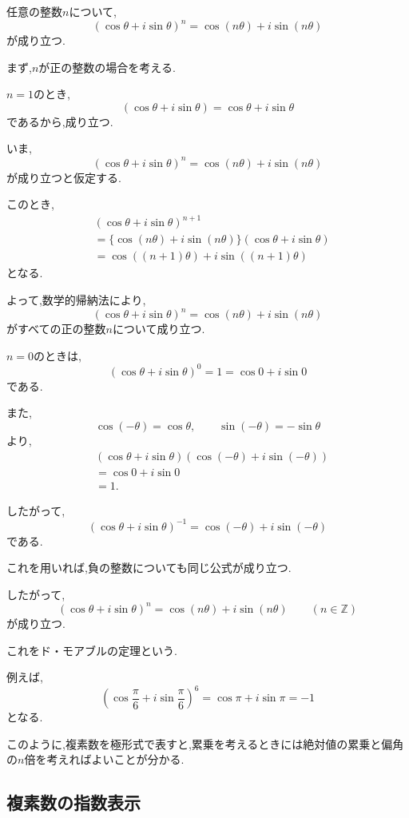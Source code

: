   任意の整数$n$について,
  \[
    (\cos\theta+i\sin\theta)^n
    =
    \cos(n\theta)+i\sin(n\theta)
  \]
  が成り立つ.

  まず,$n$が正の整数の場合を考える.

  $n=1$のとき,
  \[
    (\cos\theta+i\sin\theta)
    =
    \cos\theta+i\sin\theta
  \]
  であるから,成り立つ.

  いま,
  \[
    (\cos\theta+i\sin\theta)^n
    =
    \cos(n\theta)+i\sin(n\theta)
  \]
  が成り立つと仮定する.

  このとき,
  \begin{align*}
    &(\cos\theta+i\sin\theta)^{n+1}\\
    &=
    \{
      \cos(n\theta)+i\sin(n\theta)
    \}
    (\cos\theta+i\sin\theta)\\
    &=
    \cos((n+1)\theta)
    +i\sin((n+1)\theta)
  \end{align*}
  となる.

  よって,数学的帰納法により,
  \[
    (\cos\theta+i\sin\theta)^n
    =
    \cos(n\theta)+i\sin(n\theta)
  \]
  がすべての正の整数$n$について成り立つ.

  $n=0$のときは,
  \[
    (\cos\theta+i\sin\theta)^0
    =
    1
    =
    \cos0+i\sin0
  \]
  である.

  また,
  \[
    \cos(-\theta)=\cos\theta,
    \qquad
    \sin(-\theta)=-\sin\theta
  \]
  より,
  \begin{align*}
    &(\cos\theta+i\sin\theta)
    (\cos(-\theta)+i\sin(-\theta))\\
    &=
    \cos0+i\sin0\\
    &=
    1.
  \end{align*}

  したがって,
  \[
    (\cos\theta+i\sin\theta)^{-1}
    =
    \cos(-\theta)+i\sin(-\theta)
  \]
  である.

  これを用いれば,負の整数についても同じ公式が成り立つ.

  したがって,
  \[
    (\cos\theta+i\sin\theta)^n
    =
    \cos(n\theta)+i\sin(n\theta)
    \qquad(n\in\mathbb Z)
  \]
  が成り立つ.

  これをド・モアブルの定理という.

  例えば,
  \[
    \left(
      \cos\frac{\pi}{6}
      +i\sin\frac{\pi}{6}
    \right)^6
    =
    \cos\pi+i\sin\pi
    =
    -1
  \]
  となる.

  このように,複素数を極形式で表すと,累乗を考えるときには絶対値の累乗と偏角の$n$倍を考えればよいことが分かる.


\subsection{複素数の指数表示}

